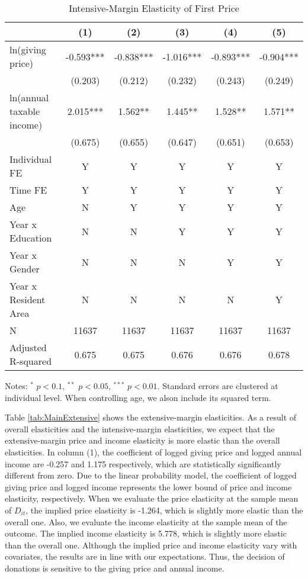 \documentclass[
  11pt,
  a4paper,
]{article}
\begin{document}
\begin{table}

\caption{\label{tab:MainIntensive}Intensive-Margin Elasticity of First Price}
\centering
\fontsize{9}{11}\selectfont
\begin{threeparttable}
\begin{tabular}[t]{lccccc}
\toprule
 & (1) & (2) & (3) & (4) & (5)\\
\midrule
ln(giving price) & -0.593*** & -0.838*** & -1.016*** & -0.893*** & -0.904***\\
 & (0.203) & (0.212) & (0.232) & (0.243) & (0.249)\\
ln(annual taxable income) & 2.015*** & 1.562** & 1.445** & 1.528** & 1.571**\\
 & (0.675) & (0.655) & (0.647) & (0.651) & (0.653)\\
Individual FE & Y & Y & Y & Y & Y\\
Time FE & Y & Y & Y & Y & Y\\
Age & N & Y & Y & Y & Y\\
Year x Education & N & N & Y & Y & Y\\
Year x Gender & N & N & N & Y & Y\\
Year x Resident Area & N & N & N & N & Y\\
N & 11637 & 11637 & 11637 & 11637 & 11637\\
Adjusted R-squared & 0.675 & 0.675 & 0.676 & 0.676 & 0.678\\
\bottomrule
\end{tabular}
\begin{tablenotes}
\item Notes: $^{*}$ $p < 0.1$, $^{**}$ $p < 0.05$, $^{***}$ $p < 0.01$. Standard errors are clustered at individual level. When controlling age, we alson include its squared term.
\end{tablenotes}
\end{threeparttable}
\end{table}

Table \ref{tab:MainExtensive} shows the extensive-margin elasticities.
As a result of overall elasticities and the intensive-margin elasticities,
we expect that the extensive-margin price and income elasticity is more elastic than the overall elasticities.
In column (1), the coefficient of logged giving price and logged annual income are -0.257 and 1.175 respectively,
which are statistically significantly different from zero.
Due to the linear probability model,
the coefficient of logged giving price and logged income represents the lower bound of price and income elasticity, respectively.
When we evaluate the price elasticity at the sample mean of \(D_{it}\),
the implied price elasticity is -1.264, which is slightly more elastic than the overall one.
Also, we evaluate the income elasticity at the sample mean of the outcome.
The implied income elasticity is 5.778, which is slightly more elastic than the overall one.
Although the implied price and income elasticity vary with covariates,
the results are in line with our expectations.
Thus, the decision of donations is sensitive to the giving price and annual income.
\end{document}
